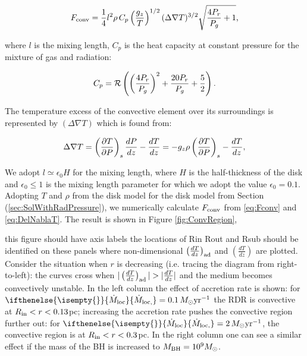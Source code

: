 \documentclass[12pt,english,preprint]{aastex}
\newcommand{\red}{\color{red}}
\newcommand{\su}[2]{#1_{\rm #2}}
\newcommand{\mdt}[1][]{ 
  \ifthenelse{\isempty{#1}}
  {\dot{M}_{\rm loc}}
  { {\dot M}_{\rm{loc},{#1}} } 
  } %
\newcommand{\Rin}{\su{R}{in}}
\newcommand{\MsolYrM}{ \,M_{\odot}{\rm yr}^{-1} }
\begin{document}
\begin{equation}
F_{{\rm conv}}=\frac{1}{4}l^{2}\rho\,C_{p}\left(\frac{g_{z}}{T}\right)^{1/2}(\Delta\nabla T)^{3/2}\sqrt{\frac{4P_r}{P_{g}}+1}\mbox{,}\label{eq:Fconv}
\end{equation}

\noindent where $l$ is the mixing length, $C_{p}$ is the heat capacity at constant pressure for the mixture
of gas and radiation:

\begin{equation}
C_{p}={\cal R}\left(\left(\frac{4P_r}{P_{g}}\right)^{2}+\frac{20P_r}{P_{g}}+\frac{5}{2}\right)\mbox{.}\label{eq:Cp}
\end{equation}

\noindent The temperature excess of the convective element over its surroundings
is represented by $(\Delta\nabla T)$ which is found from:

\begin{equation}
\Delta\nabla T=\left(\frac{\partial T}{\partial P}\right)_{s}\frac{dP}{dz}-\frac{dT}{dz}=-g_{z}\rho\left(\frac{\partial T}{\partial P}\right)_{s}-\frac{dT}{dz}\mbox{,}\label{eq:DelNablaT}
\end{equation}

\noindent We adopt $l\simeq\epsilon_{0}H$ for the mixing length, where
$H$ is the half-thickness of the disk and $\epsilon_{0}\leq1$ is
the mixing length parameter for which we adopt the value $\epsilon_{0}=0.1$.
Adopting  $T$ and $\rho$ from the disk model for the disk model from Section (\ref{sec:SolWithRadPressure}), we numerically 
calculate $\su{F}{conv}$ from \eqref{eq:Fconv} and \eqref{eq:DelNablaT}.
The result is shown in 
Figure \ref{fig:ConvRegion},

{\red this figure should have axis labels}
{\red the locations of Rin Rout and Rsub should be identified on these panels}
where non-dimensional
$\su{\left(\frac{dT}{dz}\right)}{ad}$ and $\left(\frac{dT}{dz}\right)$ are plotted. Consider the situation when $r$ is decreasing
(i.e. tracing the diagram from right-to-left): the curves cross when $\vert\su{\left(\frac{dT}{dz}\right)}{ad}\vert>\vert\frac{dT}{dz}\vert$ and 
the medium becomes convectively unstable. 
In the left column the effect of accretion rate is shown: for $\mdt=0.1\MsolYrM$ the RDR is convective at $\Rin<r<0.13$pc;
increasing the accretion rate pushes the convective region further out: for $\mdt=2\MsolYrM$, the convective region is at $\Rin<r<0.3$pc.
In the right column one can see a similar effect if the mass of the BH is increased to $\su{M}{BH}=10^9M_\odot$.
\end{document}
